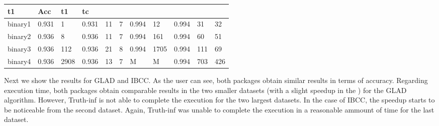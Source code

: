 \documentclass[letterpaper,10pt,english]{sphinxmanual}
\begin{document}
\begin{savenotes}
\begin{tabulary}{\linewidth}[t]{|T|T|T|T|T|T|T|T|T|T|T|}
t1
&\sphinxstyletheadfamily 
Acc
&\sphinxstyletheadfamily 
t1
&\sphinxstyletheadfamily 
tc
\\
\hline
binary1
&
0.931
&
1
&
0.931
&
11
&
7
&
0.994
&
12
&
0.994
&
31
&
32
\\
\hline
binary2
&
0.936
&
8
&
0.936
&
11
&
7
&
0.994
&
161
&
0.994
&
60
&
51
\\
\hline
binary3
&
0.936
&
112
&
0.936
&
21
&
8
&
0.994
&
1705
&
0.994
&
111
&
69
\\
\hline
binary4
&
0.936
&
2908
&
0.936
&
13
&
7
&
M
&
M
&
0.994
&
703
&
426
\\
\hline
\end{tabulary}
\par
\sphinxattableend\end{savenotes}

Next we show the results for GLAD and IBCC. As the user can see, both packages obtain similar results
in terms of accuracy. Regarding execution time, both packages obtain comparable results
in the two smaller datasets (with a slight speedup in the ) for the GLAD algorithm. However,
Truth-inf is not able to complete the execution for the two largest datasets.
In the case of IBCC, the speedup starts to be noticeable from the second dataset. Again, Truth-inf was
unable to complete the execution in a reasonable ammount of time for the last dataset.
\end{document}
